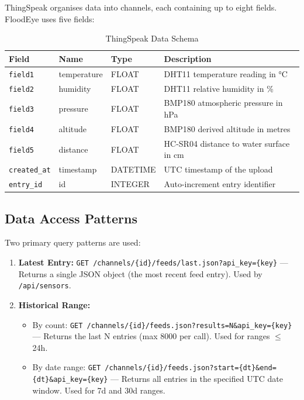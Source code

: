 ThingSpeak organises data into channels, each containing up to eight fields. FloodEye uses five fields:

\begin{table}[H]
\centering
\caption{ThingSpeak Data Schema}
\begin{tabularx}{\linewidth}{|l|l|l|X|}
\hline
\rowcolor{FloodLight}
\textbf{Field} & \textbf{Name} & \textbf{Type} & \textbf{Description} \\
\hline
\texttt{field1} & temperature & FLOAT & DHT11 temperature reading in °C \\
\texttt{field2} & humidity & FLOAT & DHT11 relative humidity in \% \\
\texttt{field3} & pressure & FLOAT & BMP180 atmospheric pressure in hPa \\
\texttt{field4} & altitude & FLOAT & BMP180 derived altitude in metres \\
\texttt{field5} & distance & FLOAT & HC-SR04 distance to water surface in cm \\
\texttt{created\_\allowbreak{}at} & timestamp & DATETIME & UTC timestamp of the upload \\
\texttt{entry\_\allowbreak{}id} & id & INTEGER & Auto-increment entry identifier \\
\hline
\end{tabularx}
\end{table}

\subsection{Data Access Patterns}

Two primary query patterns are used:

\begin{enumerate}[leftmargin=1.5em]
  \item \textbf{Latest Entry:} \texttt{GET /\allowbreak{}channels/\allowbreak{}\{id\}/feeds/last.json?api\_key=\{key\}} --- Returns a single JSON object (the most recent feed entry). Used by \texttt{/\allowbreak{}api/\allowbreak{}sensors}.
  \item \textbf{Historical Range:}
    \begin{itemize}
      \item By count: \texttt{GET /\allowbreak{}channels/\allowbreak{}\{id\}/feeds.json?results=N\&api\_key=\{key\}} --- Returns the last N entries (max 8000 per call). Used for ranges $\leq$ 24h.
      \item By date range: \texttt{GET /\allowbreak{}channels/\allowbreak{}\{id\}/feeds.json?start=\{dt\}\&end=\{dt\}\&api\_key=\{key\}} --- Returns all entries in the specified UTC date window. Used for 7d and 30d ranges.
    \end{itemize}
\end{enumerate}

